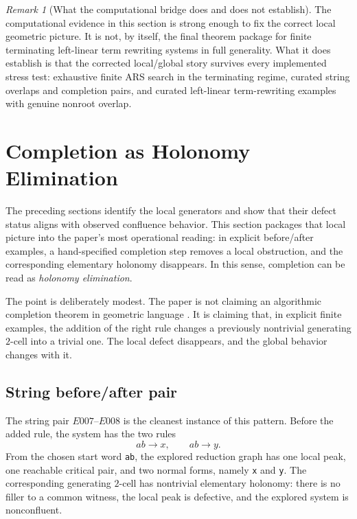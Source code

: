 \documentclass[11pt]{article}
\numberwithin{equation}{section}
\theoremstyle{definition}
\theoremstyle{remark}
\newtheorem{remark}[theorem]{Remark}
\begin{document}
\begin{remark}[What the computational bridge does and does not establish]
\label{rem:computational-bridge-scope}
The computational evidence in this section is strong enough to fix the correct local geometric picture. It is not, by itself, the final theorem package for finite terminating left-linear term rewriting systems in full generality. What it does establish is that the corrected local/global story survives every implemented stress test: exhaustive finite ARS search in the terminating regime, curated string overlaps and completion pairs, and curated left-linear term-rewriting examples with genuine nonroot overlap.
\end{remark}
 \section{Completion as Holonomy Elimination}
\label{sec:completion-holonomy}

The preceding sections identify the local generators and show that their defect status aligns with observed confluence behavior. This section packages that local picture into the paper's most operational reading: in explicit before/after examples, a hand-specified completion step removes a local obstruction, and the corresponding elementary holonomy disappears. In this sense, completion can be read as \emph{holonomy elimination}.

The point is deliberately modest. The paper is not claiming an algorithmic completion theorem in geometric language \cite{KnuthBendix1970}. It is claiming that, in explicit finite examples, the addition of the right rule changes a previously nontrivial generating $2$-cell into a trivial one. The local defect disappears, and the global behavior changes with it.

\subsection{String before/after pair}
\label{subsec:string-completion-holonomy}

The string pair $E007$--$E008$ is the cleanest instance of this pattern. Before the added rule, the system has the two rules
\[
ab \to x,
\qquad
ab \to y.
\]
From the chosen start word \texttt{ab}, the explored reduction graph has one local peak, one reachable critical pair, and two normal forms, namely \texttt{x} and \texttt{y}. The corresponding generating $2$-cell has nontrivial elementary holonomy: there is no filler to a common witness, the local peak is defective, and the explored system is nonconfluent.
\end{document}
